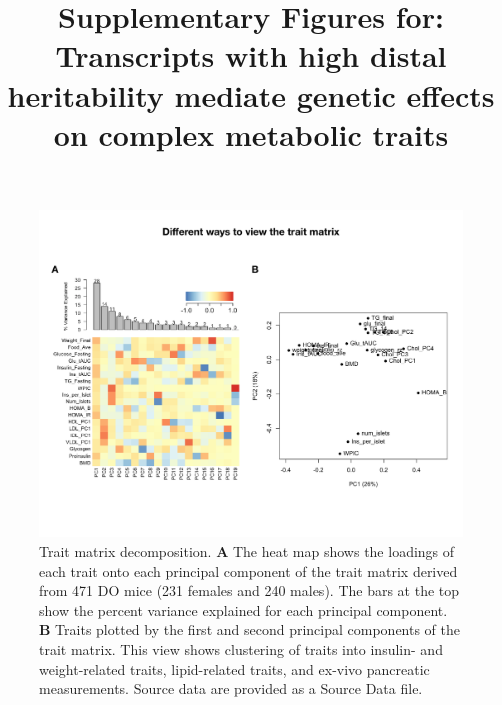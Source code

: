 \documentclass[
]{article}
\title{Supplementary Figures for: Transcripts with high distal
heritability mediate genetic effects on complex metabolic traits}
\author{}
\date{\vspace{-2.5em}}
\newcommand{\beginsupplement}{
	\renewcommand{\figurename}{Supplementary Figure}
	\setcounter{figure}{0}
}
\begin{document}
\maketitle

\beginsupplement

\begin{figure}[ht!]
\includegraphics[width=\textwidth]{Figures/Supp_Fig_Trait_Decomposition.pdf} 
\caption{Trait matrix decomposition. \textbf{A} The heat map 
shows the loadings of each trait onto each principal component 
of the trait matrix derived from 471 DO mice (231 females and 
240 males). The bars at the top show the percent variance 
explained for each principal component. \textbf{B} Traits plotted 
by the first and second principal components of the trait matrix. 
This view shows clustering of traits into insulin- and 
weight-related traits, lipid-related traits, and ex-vivo 
pancreatic measurements. Source data are provided as a Source 
Data file.
}
\label{fig:trait_decomp}
\end{figure}
\end{document}
